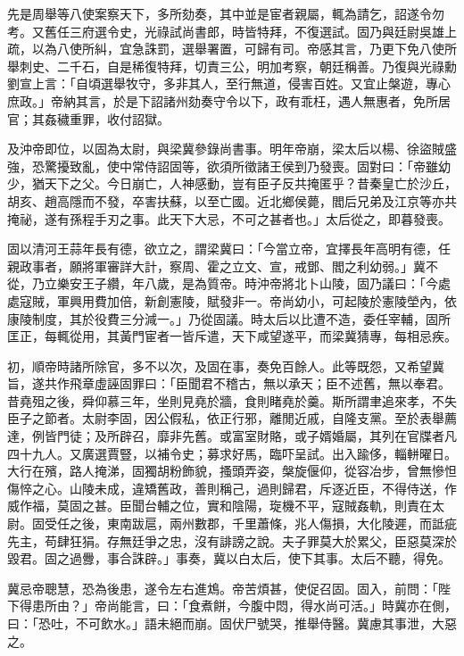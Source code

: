 \begin{pinyinscope}
先是周舉等八使案察天下，多所劾奏，其中並是宦者親屬，輒為請乞，詔遂令勿考。又舊任三府選令史，光祿試尚書郎，時皆特拜，不復選試。固乃與廷尉吳雄上疏，以為八使所糾，宜急誅罰，選舉署置，可歸有司。帝感其言，乃更下免八使所舉刺史、二千石，自是稀復特拜，切責三公，明加考察，朝廷稱善。乃復與光祿勳劉宣上言：「自頃選舉牧守，多非其人，至行無道，侵害百姓。又宜止槃遊，專心庶政。」帝納其言，於是下詔諸州劾奏守令以下，政有乖枉，遇人無惠者，免所居官；其姦穢重罪，收付詔獄。

及沖帝即位，以固為太尉，與梁冀參錄尚書事。明年帝崩，梁太后以楊、徐盜賊盛強，恐驚擾致亂，使中常侍詔固等，欲須所徵諸王侯到乃發喪。固對曰：「帝雖幼少，猶天下之父。今日崩亡，人神感動，豈有臣子反共掩匿乎？昔秦皇亡於沙丘，胡亥、趙高隱而不發，卒害扶蘇，以至亡國。近北鄉侯薨，閻后兄弟及江京等亦共掩祕，遂有孫程手刃之事。此天下大忌，不可之甚者也。」太后從之，即暮發喪。

固以清河王蒜年長有德，欲立之，謂梁冀曰：「今當立帝，宜擇長年高明有德，任親政事者，願將軍審詳大計，察周、霍之立文、宣，戒鄧、閻之利幼弱。」冀不從，乃立樂安王子纘，年八歲，是為質帝。時沖帝將北卜山陵，固乃議曰：「今處處寇賊，軍興用費加倍，新創憲陵，賦發非一。帝尚幼小，可起陵於憲陵塋內，依康陵制度，其於役費三分減一。」乃從固議。時太后以比遭不造，委任宰輔，固所匡正，每輒從用，其黃門宦者一皆斥遣，天下咸望遂平，而梁冀猜專，每相忌疾。

初，順帝時諸所除官，多不以次，及固在事，奏免百餘人。此等既怨，又希望冀旨，遂共作飛章虛誣固罪曰：「臣聞君不稽古，無以承天；臣不述舊，無以奉君。昔堯殂之後，舜仰慕三年，坐則見堯於牆，食則睹堯於羹。斯所謂聿追來孝，不失臣子之節者。太尉李固，因公假私，依正行邪，離閒近戚，自隆支黨。至於表舉薦達，例皆門徒；及所辟召，靡非先舊。或富室財賂，或子婿婚屬，其列在官牒者凡四十九人。又廣選賈豎，以補令史；募求好馬，臨吓呈試。出入踰侈，輜軿曜日。大行在殯，路人掩涕，固獨胡粉飾貌，搔頭弄姿，槃旋偃仰，從容冶步，曾無慘怛傷悴之心。山陵未成，違矯舊政，善則稱己，過則歸君，斥逐近臣，不得侍送，作威作福，莫固之甚。臣聞台輔之位，實和陰陽，琁機不平，寇賊姦軌，則責在太尉。固受任之後，東南跋扈，兩州數郡，千里蕭條，兆人傷損，大化陵遲，而詆疵先主，苟肆狂狷。存無廷爭之忠，沒有誹謗之說。夫子罪莫大於累父，臣惡莫深於毀君。固之過釁，事合誅辟。」事奏，冀以白太后，使下其事。太后不聽，得免。

冀忌帝聰慧，恐為後患，遂令左右進鴆。帝苦煩甚，使促召固。固入，前問：「陛下得患所由？」帝尚能言，曰：「食煮餅，今腹中悶，得水尚可活。」時冀亦在側，曰：「恐吐，不可飲水。」語未絕而崩。固伏尸號哭，推舉侍醫。冀慮其事泄，大惡之。


\end{pinyinscope}
